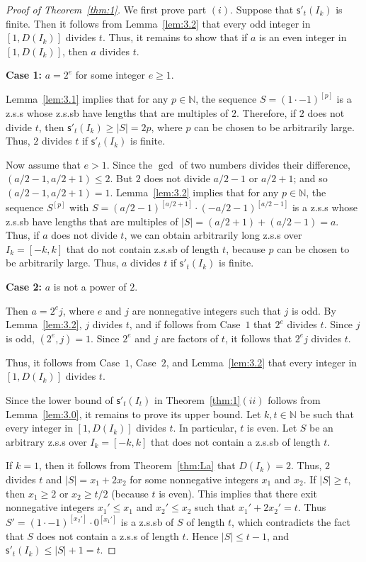 \documentclass[12 pt]{amsart}
\def \n{\noindent }
\def \bs{\bigskip}
\def \N{\mathbb N}
\def \zs{z.s.s }
\def \zsb{z.s.s{\tiny b} }
\def \m{\mathsf{s}'}
\begin{document}
%
\begin{proof}[Proof of Theorem~\ref{thm:1}]
We first prove part $(i)$. Suppose that $\m_t(I_k)$ is finite.
Then it follows from Lemma~\ref{lem:3.2} that every odd integer in $[1,D(I_k)]$ divides $t$. Thus, it remains to show that 
if $a$ is an even integer in $[1,D(I_k)]$, then $a$ divides $t$.

\n\textbf{Case 1:} $a=2^{e}$ for some integer $e\geq1$.

	Lemma~\ref{lem:3.1} implies that for any $p\in\N$, the sequence $S=\left(1\cdot-1\right)^{[p]}$ is a \zs whose 
\zsb have lengths that are multiples of $2$.  Therefore, if $2$ does not divide $t$, then $\m_t(I_k)
\geq |S|=2p$, where $p$ can be chosen to be arbitrarily large. Thus, $2$ divides $t$ if $\m_t(I_k)$ is finite.

Now assume that $e>1$. Since the $\gcd$ of two numbers divides their difference, $(a/2-1,a/2+1)\leq2$.  
But $2$ does not divide $a/2-1$ or $a/2+1$; and so 
$(a/2-1,a/2+1)=1$. Lemma~\ref{lem:3.2} implies that for any $p\in\N$, the sequence $S^{[p]}$ with 
$S= (a/2-1)^{[a/2+1]} \cdot (-a/2-1)^{[a/2-1]}$ is 
a \zs whose \zsb have lengths that are 
multiples of $|S|=(a/2+1)+(a/2-1)=a$.  Thus, 
if $a$ does not divide $t$, we can obtain arbitrarily 
long \zs over $I_k=[-k,k]$ that do not contain \zsb of length $t$,
because $p$ can be chosen to be arbitrarily large. 
Thus, $a$ divides $t$ if $\m_t(I_k)$ is finite.

\n\textbf{Case 2:}  $a$ is not a power of $2$. 

Then $a=2^{e}j$, where $e$ and $j$ are nonnegative 
integers such that $j$ is odd.  By Lemma~\ref{lem:3.2}, $j$ divides $t$, and 
if follows from Case~$1$ that $2^{e}$ divides $t$.  
Since $j$ is odd, $(2^e,j)=1$. Since $2^e$ and $j$ are factors of $t$, it follows that $2^ej$ divides $t$.

Thus, it follows from Case~$1$, Case~$2$, and Lemma~\ref{lem:3.2} that every  integer in $[1,D(I_k)]$ divides $t$.

\bs Since the lower bound of $\m_t(I_t)$ in Theorem~\ref{thm:1}$(ii)$ follows from Lemma~\ref{lem:3.0}, it remains to prove its upper bound.
Let $k,t\in\N$ be such that every integer in $[1,D(I_k)]$ divides $t$. In particular, $t$ is even.
Let $S$ be an arbitrary \zs over $I_k=[-k,k]$ that does not contain a \zsb of length $t$. 

If $k=1$, then it follows from Theorem~\ref{thm:La} that $D(I_k)=2$. Thus, $2$ divides $t$ and $|S|=x_1+2x_2$ for some nonnegative integers $x_1$ and $x_2$.  
If $|S|\geq t$, then $x_1\geq2$ or $x_2\geq t/2$ (because $t$ is even). This implies 
that there exit nonnegative integers $x_1'\leq x_1$ and $x_2'\leq x_2$ such that $x_1'+2x_2'=t$. Thus $S'=(1\cdot -1)^{[x_2']}\cdot 0^{[x_1']}$ is a \zsb of $S$ of length $t$, which contradicts 
the fact that $S$ does not contain a \zs of length $t$. Hence $|S|\leq t-1$, and $\m_t(I_k)\leq |S|+1=t$.


\end{proof}
\end{document}
